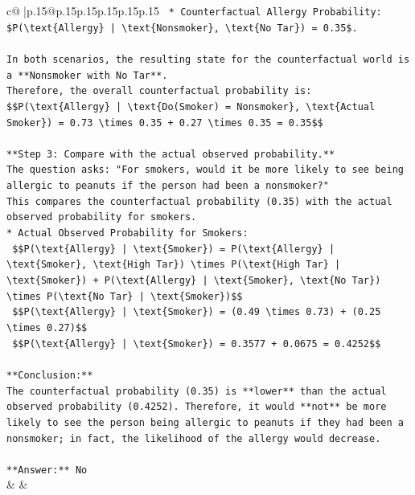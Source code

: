 \documentclass{article}
\begin{document}
{\begin{supertabular}{c@{$\;$}|p{.15\linewidth}@{}p{.15\linewidth}p{.15\linewidth}p{.15\linewidth}p{.15\linewidth}p{.15\linewidth}}
{{{\texttt{    *   Counterfactual Allergy Probability: \$P(\textbackslash{}text\{Allergy\} | \textbackslash{}text\{Nonsmoker\}, \textbackslash{}text\{No Tar\}) = 0.35\$.} \\
\\ 
\texttt{In both scenarios, the resulting state for the counterfactual world is a **Nonsmoker with No Tar**.} \\
\texttt{Therefore, the overall counterfactual probability is:} \\
\texttt{\$\$P(\textbackslash{}text\{Allergy\} | \textbackslash{}text\{Do(Smoker) = Nonsmoker\}, \textbackslash{}text\{Actual Smoker\}) = 0.73 \textbackslash{}times 0.35 + 0.27 \textbackslash{}times 0.35 = 0.35\$\$} \\
\\ 
\texttt{**Step 3: Compare with the actual observed probability.**} \\
\texttt{The question asks: "For smokers, would it be more likely to see being allergic to peanuts if the person had been a nonsmoker?"} \\
\texttt{This compares the counterfactual probability (0.35) with the actual observed probability for smokers.} \\
\texttt{*   Actual Observed Probability for Smokers:} \\
\texttt{    \$\$P(\textbackslash{}text\{Allergy\} | \textbackslash{}text\{Smoker\}) = P(\textbackslash{}text\{Allergy\} | \textbackslash{}text\{Smoker\}, \textbackslash{}text\{High Tar\}) \textbackslash{}times P(\textbackslash{}text\{High Tar\} | \textbackslash{}text\{Smoker\}) + P(\textbackslash{}text\{Allergy\} | \textbackslash{}text\{Smoker\}, \textbackslash{}text\{No Tar\}) \textbackslash{}times P(\textbackslash{}text\{No Tar\} | \textbackslash{}text\{Smoker\})\$\$} \\
\texttt{    \$\$P(\textbackslash{}text\{Allergy\} | \textbackslash{}text\{Smoker\}) = (0.49 \textbackslash{}times 0.73) + (0.25 \textbackslash{}times 0.27)\$\$} \\
\texttt{    \$\$P(\textbackslash{}text\{Allergy\} | \textbackslash{}text\{Smoker\}) = 0.3577 + 0.0675 = 0.4252\$\$} \\
\\ 
\texttt{**Conclusion:**} \\
\texttt{The counterfactual probability (0.35) is **lower** than the actual observed probability (0.4252). Therefore, it would **not** be more likely to see the person being allergic to peanuts if they had been a nonsmoker; in fact, the likelihood of the allergy would decrease.} \\
\\ 
\texttt{**Answer:** No} \\
            }
        }
    }
    & & \\ \\


\end{supertabular}}
\end{document}
